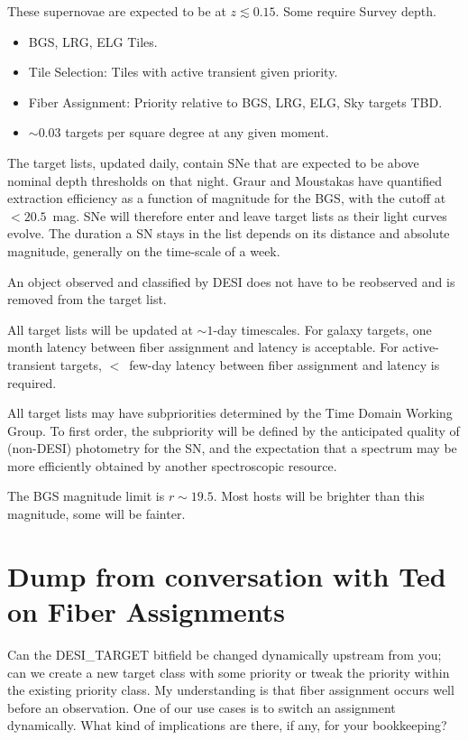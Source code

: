 \documentclass[11pt, oneside]{article}   	%
\begin{document}
\begin{itemize}
These supernovae are expected to be at $z \lesssim 0.15$.  Some require Survey depth.
\begin{itemize}
\item BGS, LRG, ELG Tiles.
\item Tile Selection: Tiles with active transient given priority.
\item Fiber Assignment: Priority relative to BGS, LRG, ELG, Sky targets TBD.
\item $\sim 0.03$ targets per square degree at any given moment.
\end{itemize}
The target lists, updated daily, contain SNe that are expected to be above nominal depth thresholds on that night.
 Graur and Moustakas have quantified extraction efficiency as a function
of magnitude for the BGS, with the cutoff at   $<20.5$~mag.
SNe will therefore enter and leave target lists as their light curves evolve. 
The duration a SN stays in the list depends on its distance
and absolute magnitude, generally on the time-scale of a week.

An object observed and classified by DESI does not have to be reobserved and is removed from the target list.
\end{itemize}

All target lists will be updated at $\sim 1$-day timescales.  For galaxy targets, one month latency between fiber assignment and latency is acceptable.
 For active-transient targets, $<$~few-day latency between fiber assignment and latency is required.

All target lists may have subpriorities determined by the Time Domain Working Group.  To first order, the subpriority will be defined by the
anticipated quality of (non-DESI)  photometry for the SN, and the expectation that a spectrum may be more efficiently obtained by another
spectroscopic resource.

The BGS magnitude limit is $r \sim 19.5$.  Most hosts will be brighter than this magnitude, some will be fainter.

\section{Dump from conversation with Ted on Fiber Assignments}
Can the DESI\_TARGET bitfield be changed dynamically upstream from you; can we create a new target class with some priority or tweak the priority within the existing priority class.  My understanding is that fiber assignment occurs well before an observation.  One of our use cases is to switch an assignment dynamically.  What kind of implications are there, if any, for your bookkeeping?  
\end{document}
